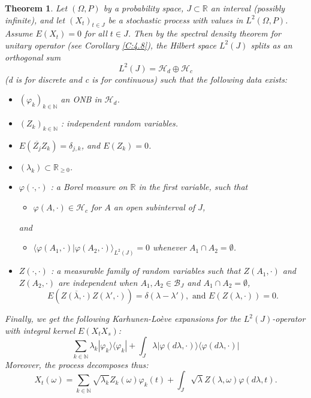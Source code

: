 \documentclass{birkmult}
\newtheorem{thm}{Theorem}[section]
\theoremstyle{definition}
\theoremstyle{remark}
\numberwithin{equation}{section}
\begin{document}
\begin{thm}
\label{T:6.1}
Let $(\Omega, P)$ by a probability space, $J \subset \mathbb{R}$ an interval 
(possibly infinite), and let $(X_{t})_{t\in J}$ be a stochastic process with 
values in $L^{2}(\Omega, P)$.  Assume $E(X_{t})=0$ for all $t \in J$.  Then 
by the spectral density theorem for unitary operator 
(see Corollary \ref{C:4.8}), the Hilbert space 
$L^{2}(J)$ splits as an orthogonal sum
\begin{equation}
\label{E:Lsum}
  L^{2}(J)=\mathcal{H}_{d}\oplus \mathcal{H}_{c}
\end{equation} 
(d is for discrete and c is for continuous) such that the following data 
exists:
\begin{itemize}
  \item[(a)] $(\varphi_{k})_{k \in \mathbb{N}}$ an ONB in $\mathcal{H}_{d}$.
  \item[(b)] $(Z_{k})_{k \in \mathbb{N}}$ : independent random variables.
  \item[(c)] $E(\overline{Z_{j}} Z_{k})=\delta_{j,k}$, and $E(Z_{k})=0$.
  \item[(d)] $(\lambda_{k}) \subset \mathbb{R}_{\geq 0}$.
  \item[(e)] $\varphi(\cdot,\cdot)$ : a Borel measure on $\mathbb{R}$ in the 
first variable, such that 
  \begin{itemize}
    \item[(i)] $\varphi(A, \cdot) \in \mathcal{H}_{c}$ for $A$ an open 
subinterval of $J$,
  \end{itemize} and
  \begin{itemize}
    \item[(ii)] $\langle\varphi(A_{1}, \cdot)| \varphi(A_{2}, \cdot)
    \rangle_{L^{2}(J)} =0$ whenever $A_{1} \cap A_{2} = \emptyset$.
  \end{itemize}
  \item[(f)] $Z(\cdot, \cdot)$ : a measurable family of random variables such
  that $Z(A_{1}, \cdot)$ and $Z(A_{2}, \cdot)$ are independent when
  $A_{1}, A_{2} \in \mathcal{B}_{J}$ and $A_{1} \cap A_{2} = \emptyset$, 
  \[
    E(\overline{Z(\lambda, \cdot)} Z(\lambda', \cdot))=\delta(\lambda-\lambda'), 
    \text{ and } E(Z(\lambda, \cdot))=0.
  \]
\end{itemize}
Finally, we get the following Karhunen-Lo\`{e}ve expansions for the 
$L^{2}(J)$-operator with integral kernel $E(X_{t} X_{s})$:
\begin{equation}
\label{E:Suml}
  \sum_{k \in \mathbb{N}} \lambda_{k}|\varphi_{k} \rangle \langle \varphi_{k}|
  + \int_{J}{\lambda|\varphi(d \lambda, \cdot)\rangle \langle 
    \varphi(d \lambda, \cdot)|}
\end{equation}
Moreover, the process decomposes thus:
\begin{equation}
\label{E:Sumsqrtl}
  X_{t}(\omega)= \sum_{k\in \mathbb{N}}\sqrt{\lambda_{k}}Z_{k}(\omega)
  \varphi_{k}(t)+\int_{J}{\sqrt{\lambda}Z(\lambda, \omega)\varphi(d\lambda, t)}. 
\end{equation}
\end{thm}
\end{document}
